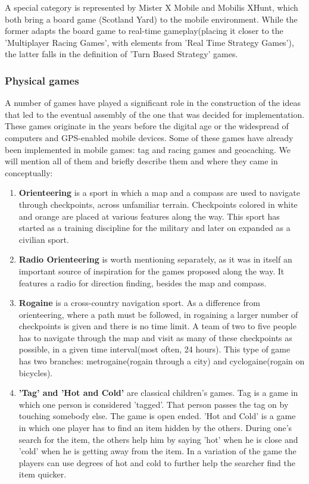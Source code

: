 \documentclass{article}
\begin{document}
A special category is represented by Mister X Mobile and Mobilis XHunt, which
both bring a board game (Scotland Yard) to the mobile environment. While the
former adapts the board game to real-time gameplay(placing it closer to the
'Multiplayer Racing Games', with elements from 'Real Time Strategy Games'), the
latter falls in the definition of 'Turn Based Strategy' games.

\subsubsection{Physical games}

A number of games have played a significant role in the construction of the
ideas that led to the eventual assembly of the one that was decided for
implementation. These games originate in the years before the digital age or the
widespread of computers and GPS-enabled mobile devices. Some of these games have
already been implemented in mobile games: tag and racing games and geocaching.
We will mention all of them and briefly describe them and where they came in
conceptually:
\begin{enumerate}
  \item \textbf{Orienteering} is a sport in which a map and a compass are used
  to navigate through checkpoints, across unfamiliar terrain. Checkpoints
  colored in white and orange are placed at various features along the way. This
  sport has started as a training discipline for the military and later on
  expanded as a civilian sport.
  
  \item \textbf{Radio Orienteering} is worth mentioning separately, as it was in
  itself an important source of inspiration for the games proposed along the
  way. It features a radio for direction finding, besides the map and compass. 
  
  \item \textbf{Rogaine} is a cross-country navigation sport. As a difference
  from orienteering, where a path must be followed, in rogaining a larger number
  of checkpoints is given and there is no time limit. A team of two to five
  people has to navigate through the map and visit as many of these checkpoints
  as possible, in a given time interval(most often, 24 hours). This type of game
  has two branches: metrogaine(rogain through a city) and cyclogaine(rogain on
  bicycles).
  
  \item \textbf{'Tag' and 'Hot and Cold'} are classical children's games. Tag is
  a game in which one person is considered 'tagged'. That person passes the tag
  on by touching somebody else. The game is open ended. 'Hot and Cold' is a game
  in which one player has to find an item hidden by the others. During one's
  search for the item, the others help him by saying 'hot' when he is close and
  'cold' when he is getting away from the item. In a variation of the game the
  players can use degrees of hot and cold to further help the searcher find the
  item quicker.
    
\end{enumerate}
\end{document}
